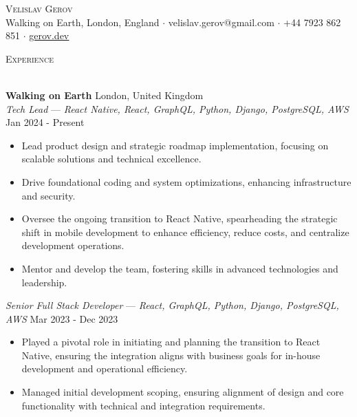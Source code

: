 \documentclass[a4paper]{article}
\newcommand{\lineunder} {
    \vspace*{-8pt} \\
    \hspace*{-18pt} \hrulefill \\
}
\newcommand{\header} [1] {
    {\hspace*{-18pt}\vspace*{6pt} \textsc{#1}}
    \vspace*{-6pt} \lineunder
}
\begin{document}
\vspace*{-40pt}



\vspace*{-10pt}
\begin{center}
    {\Huge \scshape {Velislav Gerov}}\\
    Walking on Earth, London, England $\cdot$ velislav.gerov@gmail.com $\cdot$ +44 7923 862 851 $\cdot$  \href{https://gerov.dev}{\underline{gerov.dev}}\\
\end{center}

\header{Experience}
\vspace{1mm}

\textbf{Walking on Earth} \hfill London, United Kingdom\\
\textit{Tech Lead} — {\sl React Native, React, GraphQL, Python, Django, PostgreSQL, AWS} \hfill Jan 2024 - Present\\
\vspace{-1mm}
\begin{itemize} \itemsep 1pt
    \item Lead product design and strategic roadmap implementation, focusing on scalable solutions and technical excellence.
    \item Drive foundational coding and system optimizations, enhancing infrastructure and security.
    \item Oversee the ongoing transition to React Native, spearheading the strategic shift in mobile development to enhance efficiency, reduce costs, and centralize development operations.
    \item Mentor and develop the team, fostering skills in advanced technologies and leadership.
\end{itemize}

\textit{Senior Full Stack Developer} — {\sl React, GraphQL, Python, Django, PostgreSQL, AWS} \hfill Mar 2023 - Dec 2023\\
\vspace{-1mm}
\begin{itemize} \itemsep 1pt
    \item Played a pivotal role in initiating and planning the transition to React Native, ensuring the integration aligns with business goals for in-house development and operational efficiency.
    \item Managed initial development scoping, ensuring alignment of design and core functionality with technical and integration requirements.
\end{itemize}
\end{document}
